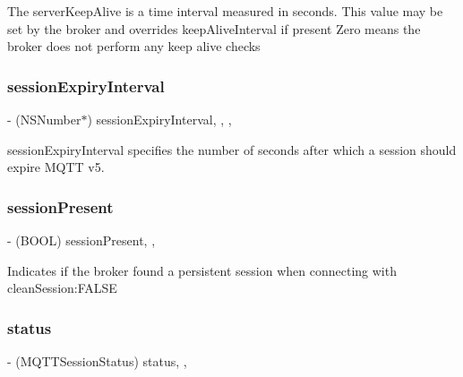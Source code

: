 The server\+Keep\+Alive is a time interval measured in seconds. This value may be set by the broker and overrides keep\+Alive\+Interval if present Zero means the broker does not perform any keep alive checks \mbox{\label{interface_m_q_t_t_session_a03173ce5c561ad884fd4c3c86b893f54}} 
\subsubsection{\texorpdfstring{session\+Expiry\+Interval}{sessionExpiryInterval}}
{\footnotesize\ttfamily -\/ (N\+S\+Number$\ast$) session\+Expiry\+Interval\hspace{0.3cm}{\ttfamily [read]}, {\ttfamily [write]}, {\ttfamily [nonatomic]}, {\ttfamily [strong]}}

session\+Expiry\+Interval specifies the number of seconds after which a session should expire M\+Q\+TT v5. \mbox{\label{interface_m_q_t_t_session_ad0712c44abf0f514feb9462779d3e2b8}} 
\subsubsection{\texorpdfstring{session\+Present}{sessionPresent}}
{\footnotesize\ttfamily -\/ (B\+O\+OL) session\+Present\hspace{0.3cm}{\ttfamily [read]}, {\ttfamily [nonatomic]}, {\ttfamily [assign]}}

Indicates if the broker found a persistent session when connecting with clean\+Session\+:F\+A\+L\+SE \mbox{\label{interface_m_q_t_t_session_adff1474fe186b8af3bb4cac1ccd4ff2d}} 
\subsubsection{\texorpdfstring{status}{status}}
{\footnotesize\ttfamily -\/ (M\+Q\+T\+T\+Session\+Status) status\hspace{0.3cm}{\ttfamily [read]}, {\ttfamily [nonatomic]}, {\ttfamily [assign]}}

